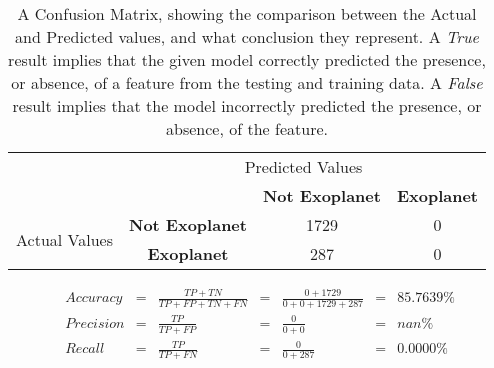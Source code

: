 
    \renewcommand{\arraystretch}{2}
    \renewcommand{\tabcolsep}{20.25pt}
    \begin{table}[ht]
    \begin{tabular}{cccc}
     & \multicolumn{3}{c}{Predicted Values} \\ \cline{3-4}
     & \multicolumn{1}{c|}{} & \multicolumn{1}{c|}{\textbf{Not Exoplanet}} & \multicolumn{1}{c|}{\textbf{Exoplanet}} \\ \cline{2-4}
    \multicolumn{1}{c|}{\multirow{2}{2.0cm}{Actual Values}} & \multicolumn{1}{c|}{\textbf{Not Exoplanet}} & \multicolumn{1}{c|}{1729} & \multicolumn{1}{c|}{0} \\ \cline{2-4}
    \multicolumn{1}{c|}{} & \multicolumn{1}{c|}{\textbf{Exoplanet}} & \multicolumn{1}{c|}{287} & \multicolumn{1}{c|}{0} \\ \cline{2-4}
    \end{tabular}
    \caption{A Confusion Matrix, showing the comparison between the Actual and Predicted values, and what conclusion they represent. A \emph{True} result implies that the given model correctly predicted the presence, or absence, of a feature from the testing and training data. A \emph{False} result implies that the model incorrectly predicted the presence, or absence, of the feature.}
    \label{tab:sklearn-SVMconfusionmatrix}
    \end{table}

    \label{eq:precisionsklearn-SVM}
    \begin{align*}
        Accuracy &= &\frac{TP + TN}{TP + FP + TN + FN} &= &\frac{0 + 1729}{0 + 0 + 1729 + 287} &= & 85.7639\% \\
        Precision &= &\frac{TP}{TP + FP} &= &\frac{0}{0 + 0} &= & nan\% \\
        Recall &= &\frac{TP}{TP + FN} &= &\frac{0}{0 + 287} &= & 0.0000\% \\
    \end{align*}

    \renewcommand{\arraystretch}{1}
    \renewcommand{\tabcolsep}{5.25pt}
    